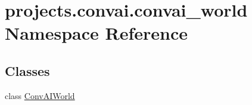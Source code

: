 \hypertarget{namespaceprojects_1_1convai_1_1convai__world}{}\section{projects.\+convai.\+convai\+\_\+world Namespace Reference}
\label{namespaceprojects_1_1convai_1_1convai__world}
\subsection*{Classes}
\begin{DoxyCompactItemize}
\item 
class \hyperlink{classprojects_1_1convai_1_1convai__world_1_1ConvAIWorld}{Conv\+A\+I\+World}
\end{DoxyCompactItemize}

